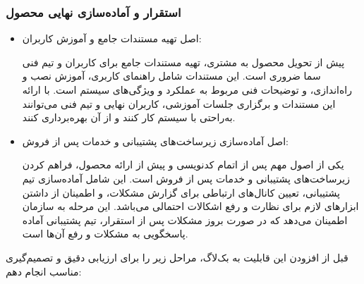 \subsubsection*{استقرار و آماده‌سازی نهایی محصول}
\begin{itemize}
    \item
    اصل تهیه مستندات جامع و آموزش کاربران:

    پیش از تحویل محصول به مشتری، تهیه مستندات جامع برای کاربران و تیم فنی سما ضروری است. این مستندات شامل راهنمای کاربری، آموزش نصب و راه‌اندازی، و توضیحات فنی مربوط به عملکرد و ویژگی‌های سیستم است. با ارائه این مستندات و برگزاری جلسات آموزشی، کاربران نهایی و تیم فنی می‌توانند به‌راحتی با سیستم کار کنند و از آن بهره‌برداری کنند.
    \item اصل آماده‌سازی زیرساخت‌های پشتیبانی و خدمات پس از فروش:
    
    یکی از اصول مهم پس از اتمام کدنویسی و پیش از ارائه محصول، فراهم کردن زیرساخت‌های پشتیبانی و خدمات پس از فروش است. این شامل آماده‌سازی تیم پشتیبانی، تعیین کانال‌های ارتباطی برای گزارش مشکلات، و اطمینان از داشتن ابزارهای لازم برای نظارت و رفع اشکالات احتمالی می‌باشد. این مرحله به سازمان اطمینان می‌دهد که در صورت بروز مشکلات پس از استقرار، تیم پشتیبانی آماده پاسخگویی به مشکلات و رفع آن‌ها است.
\end{itemize}

\pagebreak


قبل از افزودن این قابلیت به بک‌لاگ، مراحل زیر را برای ارزیابی دقیق و تصمیم‌گیری مناسب انجام دهم:

